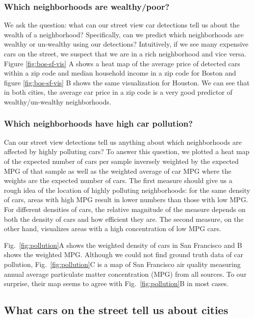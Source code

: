 \documentclass[10pt,twocolumn,letterpaper]{article}
\begin{document}
\subsubsection{Which neighborhoods are wealthy/poor?}
We ask the question: what can our street view car detections tell us about the wealth of a neighborhood? Specifically, can we predict which neighborhoods are wealthy or un-wealthy using our detections? Intuitively, if we see many expensive cars on the street, we suspect that we are in a rich neighborhood and vice versa. Figure \ref{fig:bos-sf-vis} A shows a heat map of the average price of detected cars within a zip code and median household income in a zip code for Boston and figure \ref{fig:bos-sf-vis} B shows the same visualization for Houston. We can see that in both cities, the average car price in a zip code is a very good predictor of wealthy/un-wealthy neighborhoods.


\subsubsection{Which neighborhoods have high car pollution?}
Can our street view detections tell us anything about which neighborhoods are affected by highly polluting cars? To answer this question, we plotted a heat map of the expected number of cars per sample inversely weighted by the expected MPG of that sample as well as the weighted average of car MPG where the weights are the expected number of cars. The first measure should give us a rough idea of the location of highly polluting neighborhoods: for the same density of cars, areas with high MPG result in lower numbers than those with low MPG. For different densities of cars, the relative magnitude of the measure depends on both the density of cars and how efficient they are. The second measure, on the other hand, visualizes areas with a high concentration of low MPG cars.

Fig.~\ref{fig:pollution}A shows the weighted density of cars in San Francisco and B shows the weighted MPG. Although we could not find ground truth data of car pollution, Fig.~\ref{fig:pollution}C is a map of San Francisco air quality measuring annual average particulate matter concentration (MPG) from all sources. To our surprise, their map seems to agree with Fig.~\ref{fig:pollution}B in most cases.


\subsection{What cars on the street tell us about cities}
\end{document}
